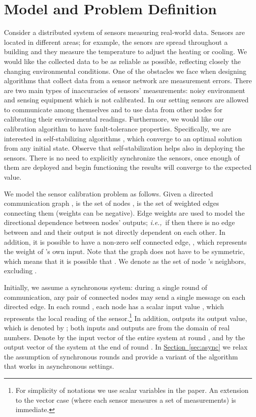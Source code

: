 \documentclass[preprint,12pt]{elsarticle}
\newcommand{\ie}{\emph{i.e.,\ }}
\newcommand{\namedref}[2]{\hyperref[#2]{#1~\ref*{#2}}}
\newcommand{\sectionref}[1]{\namedref{Section}{#1}}
\begin{document}
\section{Model and Problem Definition}\label{sec:model}
Consider a distributed system of sensors measuring real-world
data. Sensors are located in different areas; for example, the
senors are spread throughout a building and they measure the
temperature to adjust the heating or cooling. We would like the
collected data to be as reliable as possible, reflecting closely the changing
environmental conditions. One of the obstacles we face when designing
algorithms that collect data from a sensor network are measurement errors.
There are two main types of inaccuracies of sensors' measurements: noisy environment
and sensing equipment which is not calibrated.
In our setting sensors are allowed to
communicate among themselves
and
to use data from other nodes for
calibrating their
environmental readings.
Furthermore, we would like our
calibration algorithm to have fault-tolerance properties.
Specifically, we are interested in self-stabilizing algorithms
\cite{DolevSSBook}, which converge to an optimal solution from
any initial state. Observe that self-stabilization helps also in deploying the sensors.
There is no need to explicitly synchronize the sensors, once enough of them
are deployed and begin functioning the results will converge to the expected value.

We model the sensor calibration problem as follows. Given a directed
communication graph ,  is the set of nodes ,  is the set of weighted edges connecting
them (weights can be negative). Edge weights are used to model the directional dependence between nodes' outputs; \ie if  then there is no edge between  and  and their output is not directly dependent on each other. In addition, it is possible to have a non-zero self
connected edge, , which represents the weight of 's own input. Note that the graph
does not have to be symmetric, which means that it is possible that .
We denote  as the set of node 's neighbors, excluding . 

Initially, we assume a synchronous system: during a single round of communication, any pair of connected
nodes may send a single message on each directed edge. In each round
, each node  has a scalar input value , which
represents the local reading of the sensor.\footnote{For simplicity
of notations we use scalar variables in the paper. An extension to
the vector case (where each sensor measures a set of measurements) is immediate.} In addition,  outputs its
output value, which is denoted by ; both inputs and outputs are from the domain of real numbers. Denote by  the
input vector of the entire system at round , and by 
the output vector of the system at the end of round .
In \sectionref{sec:async} we relax the assumption of synchronous rounds
and provide a variant of the algorithm that works in asynchronous settings.
\end{document}
